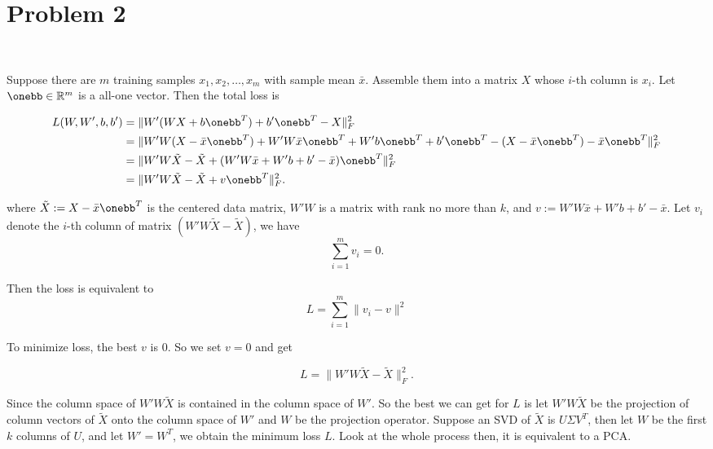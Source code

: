 \section{Problem 2}~\label{sec:prob2}

Suppose there are $m$ training samples $x_1, x_2,\dots,x_m$
with sample mean $\bar x$.
Assemble them into a matrix $X$ whose $i$-th column is $x_i$.
Let $\onebb\in\real^m$ is a all-one vector.
Then the total loss is

\begin{equation}
\begin{split}
    L(W, W', b, b')
        &= \|W'(WX + b\onebb^T) + b'\onebb^T - X\|_F^2 \\
        &= \|W'W(X-\bar x\onebb^T) + W'W\bar x\onebb^T + W'b\onebb^T + b'\onebb^T - (X-\bar x\onebb^T)-\bar x\onebb^T\|_F^2 \\
        &= \|W'W\tilde X - \tilde X + (W'W\bar x+W'b+b'-\bar x)\onebb^T\|_F^2 \\
        &= \|W'W\tilde X - \tilde X + v\onebb^T\|_F^2. \\
\end{split}
\end{equation}

where $\tilde X:=X-\bar x\onebb^T$ is the centered data matrix,
$W'W$ is a matrix with rank no more than $k$,
and $v:=W'W\bar x+W'b+b'-\bar x$.
Let $v_i$ denote the $i$-th column of matrix $(W'W\tilde X - \tilde X)$,
we have
\begin{equation}
    \sum_{i=1}^m v_i = 0.
\end{equation}

Then the loss is equivalent to
\begin{equation}
    L = \sum_{i=1}^m \|v_i-v\|^2
\end{equation}

To minimize loss,
the best $v$ is $0$.
So we set $v=0$ and get

\begin{equation}
    L = \|W'W\tilde X - \tilde X \|_F^2.
\end{equation}

Since the column space of $W'W\tilde X$ is contained in the
column space of $W'$.
So the best we can get for $L$ is let $W'W\tilde X$
be the projection of column vectors of $\tilde X$ onto
the column space of $W'$ and $W$ be the projection operator.
Suppose an SVD of $\tilde X$ is $U\Sigma V^T$,
then let $W$ be the first $k$ columns of $U$,
and let $W'=W^T$,
we obtain the minimum loss $L$.
Look at the whole process then,
it is equivalent to a PCA.
